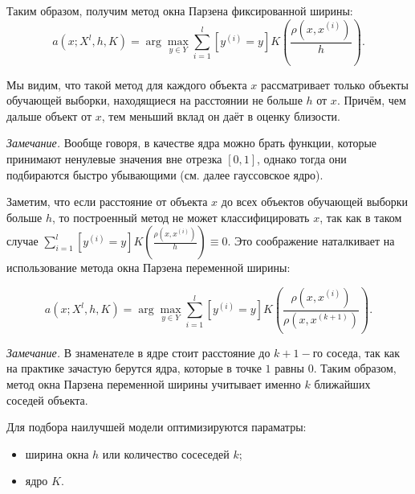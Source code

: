 Таким образом, получим метод окна Парзена фиксированной ширины:
\begin{equation*}
	\displaystyle a(x; X^l, h, K) = \arg\max_{y\in Y} \sum\limits_{i=1}^l[y^{(i)}=y]K\left(\frac{\rho(x, x^{(i)})}{h}\right). 
\end{equation*}

Мы видим, что такой метод для каждого объекта $x$ рассматривает только объекты обучающей выборки, находящиеся на расстоянии не больше $h$ от $x$. Причём, чем дальше объект от $x$, тем  меньший вклад он даёт в оценку близости.

\textit{Замечание.} Вообще говоря, в качестве ядра можно брать функции, которые принимают ненулевые значения вне отрезка $[0,1]$, однако тогда они подбираются быстро убывающими (см. далее гауссовское ядро).

Заметим, что если расстояние от объекта $x$ до всех объектов обучающей выборки больше $h$, то построенный метод не может классифицировать $x$, так как в таком случае $\displaystyle\sum\limits_{i=1}^l[y^{(i)}=y]K\left(\frac{\rho(x, x^{(i)})}{h}\right) \equiv 0$. Это соображение наталкивает на использование метода окна Парзена переменной ширины:

\begin{equation*}
	\displaystyle a(x; X^l, h, K) = \arg\max_{y\in Y} \sum\limits_{i=1}^l[y^{(i)}=y]K\left(\frac{\rho(x, x^{(i)})}{\rho(x, x^{(k+1)})}\right). 
\end{equation*}

\textit{Замечание.} В знаменателе в ядре стоит расстояние до $k+1-$го соседа, так как на практике зачастую берутся ядра, которые в точке $1$ равны $0$. Таким образом, метод окна Парзена переменной ширины учитывает именно $k$ ближайших соседей объекта.

Для подбора наилучшей модели оптимизируются параматры:
\begin{itemize}
	\item ширина окна $h$ или количество сосеседей $k$;
	\item ядро $K$.
\end{itemize}

